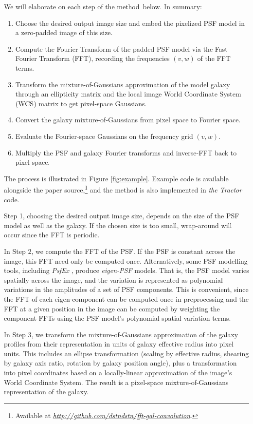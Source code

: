 \documentclass[11pt,preprint]{aastex}
\newcommand{\niceurl}[1]{\href{#1}{\textsl{#1}}}
\newcommand{\project}[1]{\textsl{#1}}
\newcommand{\trick}{method}
\begin{document}
We will elaborate on each step of the \trick\ below.  In summary:
\begin{enumerate}
\item Choose the desired output image size and embed the pixelized PSF
  model in a zero-padded image of this size.
\item Compute the Fourier Transform of the padded PSF model via the
  Fast Fourier Transform (FFT),
  recording the frequencies $(v, w)$ of the FFT terms.
\item Transform the mixture-of-Gaussians approximation of the model
  galaxy through an ellipticity matrix and the local image World
  Coordinate System (WCS) matrix to get pixel-space Gaussians.
\item Convert the galaxy mixture-of-Gaussians from pixel space to Fourier space.
\item Evaluate the Fourier-space Gaussians on the frequency grid $(v, w)$.
\item Multiply the PSF and galaxy Fourier transforms and inverse-FFT
  back to pixel space.
\end{enumerate}

The process is illustrated in Figure \ref{fig:example}.  Example code
is available alongside the paper source,\footnote{ Available at
  \niceurl{http://github.com/dstndstn/fft-gal-convolution}.}  and the
method is also implemented in \project{the Tractor} code.

Step 1, choosing the desired output image size, depends on the size of
the PSF model as well as the galaxy.  If the chosen size is too small,
wrap-around will occur since the FFT is periodic.

In Step 2, we compute the FFT of the PSF.  If the PSF is constant
across the image, this FFT need only be computed once.  Alternatively,
some PSF modelling tools, including \project{PsfEx} \citep{psfex},
produce \emph{eigen-PSF} models.  That is, the PSF model varies
spatially across the image, and the variation is represented as
polynomial variations in the amplitudes of a set of PSF components.
This is convenient, since the FFT of each eigen-component can be
computed once in preprocessing and the FFT at a given position in the
image can be computed by weighting the component FFTs using the PSF
model's polynomial spatial variation terms.

In Step 3, we transform the mixture-of-Gaussians approximation of the
galaxy profiles from their representation in units of galaxy effective
radius into pixel units.  This includes an ellipse transformation
(scaling by effective radius, shearing by galaxy axis ratio, rotation
by galaxy position angle), plus a transformation into pixel
coordinates based on a locally-linear approximation of the image's
World Coordinate System.
The result is a pixel-space mixture-of-Gaussians representation of the
galaxy.
\end{document}
